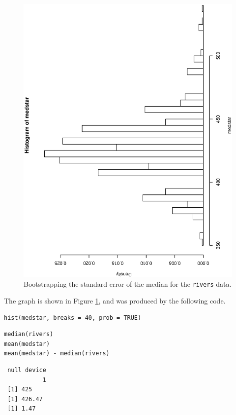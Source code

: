 \documentclass[captions=tableheading]{scrbook}
\begin{document}
\begin{example}
\begin{figure}[th]
    \includegraphics[angle=270, totalheight=4in]{img/Bootstrapping-se-median.ps}
    \caption[Bootstrapping the standard error of the median for the \texttt{rivers} data]{\small Bootstrapping the standard error of the median for the \texttt{rivers} data.}
    \label{fig:Bootstrapping-se-median}
  \end{figure}

The graph is shown in Figure \ref{fig:Bootstrapping-se-median}, and was produced by the following code.


\begin{verbatim}
hist(medstar, breaks = 40, prob = TRUE)
\end{verbatim}


\begin{verbatim}
median(rivers)
mean(medstar)
mean(medstar) - median(rivers)
\end{verbatim}

\begin{verbatim}
 null device 
           1
 [1] 425
 [1] 426.47
 [1] 1.47
\end{verbatim}

\end{example}
\end{document}
